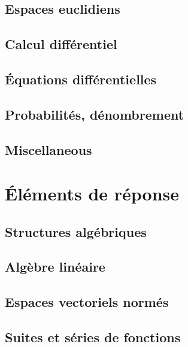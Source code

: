 \documentclass[12pt]{scrartcl}
\begin{document}
    \subsection{Espaces euclidiens}
    

    \subsection{Calcul différentiel}
    

    \subsection{Équations différentielles}
    

    \subsection{Probabilités, dénombrement}
    

    \subsection{Miscellaneous}
    

    \section{Éléments de réponse}

    \subsection{Structures algébriques}
    

    \subsection{Algèbre linéaire}
    

    \subsection{Espaces vectoriels normés}
    

    \subsection{Suites et séries de fonctions}
    
\end{document}

